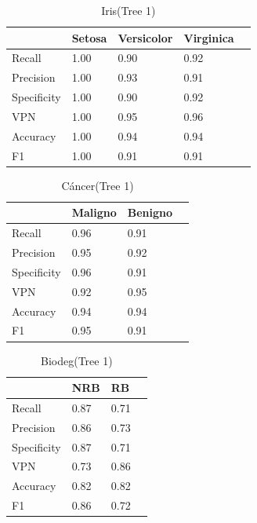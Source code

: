\documentclass[a4paper,openwrite,12pt]{article}
\begin{document}
\begin{table}[H]
\centering
\begin{tabular}{@{}lllll@{}}
\toprule
            & Setosa & Versicolor & Virginica &  \\ \midrule
Recall      & 1.00   & 0.90       & 0.92      &  \\
Precision   & 1.00   & 0.93       & 0.91      &  \\
Specificity & 1.00   & 0.90       & 0.92      &  \\
VPN         & 1.00   & 0.95       & 0.96      &  \\
Accuracy    & 1.00   & 0.94       & 0.94      &  \\
F1          & 1.00   & 0.91       & 0.91      &  \\ \bottomrule
\end{tabular}
\caption{Iris(Tree 1)}
\end{table}


\begin{table}[H]
\centering
\begin{tabular}{@{}llll@{}}
\toprule
            & Maligno & Benigno &  \\ \midrule
Recall      & 0.96    & 0.91    &  \\
Precision   & 0.95    & 0.92    &  \\
Specificity & 0.96    & 0.91    &  \\
VPN         & 0.92    & 0.95    &  \\
Accuracy    & 0.94    & 0.94    &  \\
F1          & 0.95    & 0.91    &  \\ \bottomrule
\end{tabular}
\caption{Cáncer(Tree 1)}
\end{table}


\begin{table}[H]
\centering
\begin{tabular}{@{}llll@{}}
\toprule
            & NRB &   RB &  \\ \midrule
Recall      & 0.87    & 0.71    &  \\
Precision   & 0.86    & 0.73    &  \\
Specificity & 0.87    & 0.71    &  \\
VPN         & 0.73    & 0.86    &  \\
Accuracy    & 0.82    & 0.82    &  \\
F1          & 0.86    & 0.72    &  \\ \bottomrule
\end{tabular}
\caption{Biodeg(Tree 1)}
\end{table}
\end{document}
